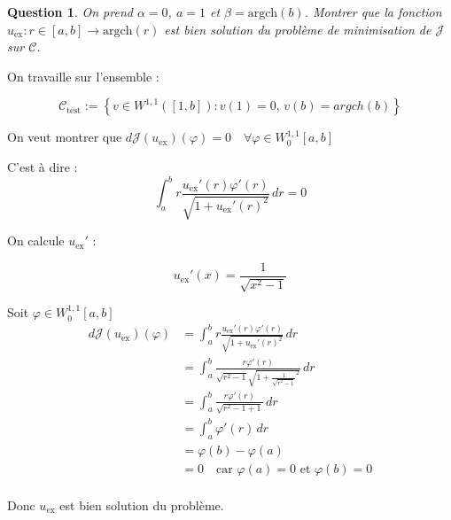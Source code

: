 \documentclass{article}
\newcommand{\Set}[1]{ \left\{ #1 \right\} }
\newcommand{\FunctionWithSqrt}[1]{ \sqrt{1 + #1 ^2} }
\newcommand{\Sobolev}[1]{ W^{1,1}\left( #1 \right) }
\newcommand{\Integral}[4]{ \int_{#1}^{#2} #3 \, d#4 }
\newtheorem{question}{Question}[subsection]
\newenvironment{answer}
  {\color{blue}}
  {}
\newcommand{\QuestionAnswer}[2]{
    \begin{question}
        #1
    \end{question}
    \begin{answer}
        #2
    \end{answer}
}
\newcommand{\SetC}{\mathcal{C}}
\newcommand{\FunctionJ}{\mathcal{J}}
\begin{document}
\QuestionAnswer{
    On prend $\alpha = 0$, $a = 1$ et $\beta = \text{argch}(b)$. Montrer que la fonction $u_{\text{ex}} : r \in [a, b] \to \text{argch}(r)$ est bien solution du problème de minimisation de $\mathcal{J}$ sur $\SetC$.
}{
    On travaille sur l'ensemble :

    $$\SetC_\text{test} := \Set{v \in \Sobolev{[1, b]} : v(1) = 0, \, v(b) = argch(b) }$$

    On veut montrer que $d\FunctionJ(u_{\text{ex}})(\varphi) = 0 \quad \forall \varphi \in W^{1,1}_0[a,b]$

    C'est à dire :
    $$\Integral{a}{b}{ r \frac{u_{\text{ex}}'(r)\varphi'(r)}{\FunctionWithSqrt{u_{\text{ex}}'(r)}} }{r} = 0$$

    On calcule $u_{\text{ex}}'$ :

    $$u_{\text{ex}}'(x) = \frac{1}{\sqrt{x^2-1}}$$

    Soit $\varphi \in W^{1,1}_0[a,b]$
    \begin{align*}
        d\FunctionJ(u_{\text{ex}})(\varphi) &= \Integral{a}{b}{ r \frac{u_{\text{ex}}'(r)\varphi'(r)}{\FunctionWithSqrt{u_{\text{ex}}'(r)}} }{r} \\
        &= \Integral{a}{b}{ \frac{r \varphi'(r)}{\sqrt{r^2-1} \FunctionWithSqrt{\frac{1}{\sqrt{r^2-1}}}} }{r} \\
        &= \Integral{a}{b}{ \frac{ r \varphi'(r)}{
        \sqrt{r^2 - 1 + 1} }}{r} \\
        &= \Integral{a}{b}{ \varphi'(r) }{r} \\
        &= \varphi(b) - \varphi(a) \\
        &= 0 \quad \text{car } \varphi(a) = 0 \text{ et } \varphi(b) = 0 \\
    \end{align*}

    Donc $u_{\text{ex}}$ est bien solution du problème.
}
\end{document}
